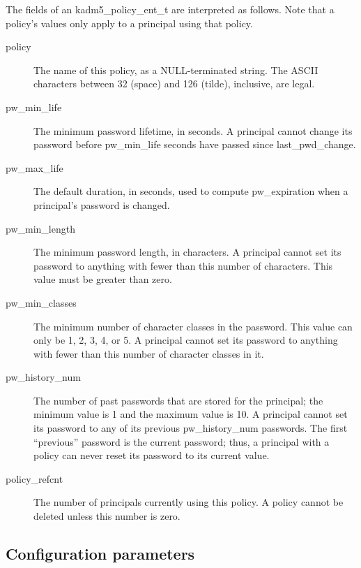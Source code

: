 The fields of an kadm5_policy_ent_t are interpreted as follows.
Note that a policy's values only apply to a principal using that
policy.

\begin{description}
\item[policy] The name of this policy, as a NULL-terminated string.
The ASCII characters between 32 (space) and 126 (tilde), inclusive,
are legal.

\item[pw_min_life] The minimum password lifetime, in seconds.
A principal cannot change its password before pw_min_life seconds have
passed since last_pwd_change.

\item[pw_max_life] The default duration, in seconds, used to compute
pw_expiration when a principal's password is changed.

\item[pw_min_length] The minimum password length, in characters.  A
principal cannot set its password to anything with fewer than this
number of characters.  This value must be greater than zero.

\item[pw_min_classes] The minimum number of character classes in the
password.  This value can only be 1, 2, 3, 4, or 5.  A principal cannot
set its password to anything with fewer than this number of character
classes in it.

\item[pw_history_num] The number of past passwords that are
stored for the principal; the minimum value is 1 and the maximum value
is 10.  A principal cannot set its password to any of its previous
pw_history_num passwords.  The first ``previous'' password is the
current password; thus, a principal with a policy can never reset its
password to its current value.

\item[policy_refcnt]  The number of principals currently using this policy.
A policy cannot be deleted unless this number is zero.
\end{description}

\subsection{Configuration parameters}
\label{sec:configparams}

